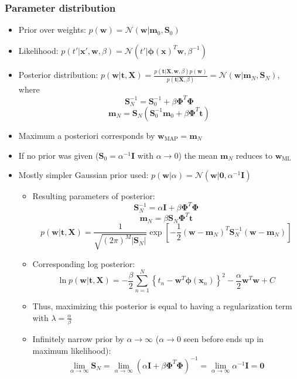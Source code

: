 \subsubsection{Parameter distribution}
\begin{itemize}
	\item Prior over weights: $p(\bm{w}) = \mathcal{N}\left(\bm{w}|\bm{m}_0, \bm{S}_0\right)$
	\item Likelihood: $p\left(t'|\bm{x}', \bm{w}, \beta\right)=\mathcal{N}\left(t'|\bm{\phi}(\bm{x})^T\bm{w}, \beta^{-1}\right)$
	\item Posterior distribution: $p(\bm{w}|\bm{t}, \bm{X}) = \frac{p\left(\bm{t}|\bm{X}, \bm{w}, \beta\right) p\left(\bm{w}\right)}{p\left(\bm{t}|\bm{X}, \beta\right)} = \mathcal{N}\left(\bm{w}|\bm{m}_N, \bm{S}_N\right)$, where\\
	$$\bm{S}_N^{-1}=\bm{S}_0^{-1} + \beta \bm{\Phi}^T\bm{\Phi}$$
	$$\bm{m}_N = \bm{S}_N\left(\bm{S}_0^{-1}\bm{m}_0+\beta\bm{\Phi}^T\bm{t}\right)$$
	\item Maximum a posteriori corresponds by $\bm{w}_{\text{MAP}} = \bm{m}_N$
	\item If no prior was given ($\bm{S}_0=\alpha^{-1} \bm{I}$ with $\alpha\to0$) the mean $\bm{m}_N$ reduces to $\bm{w}_{\text{ML}}$
	\item Mostly simpler Gaussian prior used: $p(\bm{w}|\alpha) = \mathcal{N}\left(\bm{w}|\bm{0}, \alpha^{-1}\bm{I}\right)$
	\begin{itemize}
		\item Resulting parameters of posterior: 
		$$\bm{S}_N^{-1}=\alpha\bm{I} + \beta \bm{\Phi}^T\bm{\Phi}$$
		$$\bm{m}_N = \beta \bm{S}_N\bm{\Phi}^T\bm{t}$$
		$$p(\bm{w}|\bm{t}, \bm{X})=\frac{1}{\sqrt{\left(2\pi\right)^M |\bm{S}_N|}}\exp\left[-\frac{1}{2}\left(\bm{w}-\bm{m}_N\right)^T \bm{S}_N^{-1} \left(\bm{w}-\bm{m}_N\right)\right]$$
		\item Corresponding log posterior: 
		$$\ln p\left(\bm{w}|\bm{t}, \bm{X}\right) = -\frac{\beta}{2}\sum\limits_{n=1}^{N}\left\{t_n - \bm{w}^T \bm{\phi}\left(\bm{x}_n\right)\right\}^2 - \frac{\alpha}{2}\bm{w}^T \bm{w} + C$$
		\item Thus, maximizing this posterior is equal to having a regularization term with $\lambda=\frac{\alpha}{\beta}$
		\item Infinitely narrow prior by $\alpha\to\infty$ ($\alpha\to0$ seen before ends up in maximum likelihood):
		$$\lim\limits_{\alpha\to\infty} \bm{S}_N = \lim\limits_{\alpha\to\infty} \left(\alpha\bm{I}+\beta \bm{\Phi}^{T}\bm{\Phi}\right)^{-1} = \lim\limits_{\alpha\to\infty} \alpha^{-1}\bm{I} = \bm{0}$$

\end{itemize}
\end{itemize}
